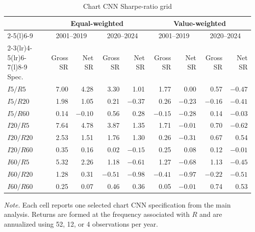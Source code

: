 \begin{table}[htbp]
\centering
\caption{Chart CNN Sharpe-ratio grid}
\label{tab:app_chart_grid}
\scriptsize
\setlength{\tabcolsep}{4.2pt}
\begin{tabular}{@{}lrrrrrrrr@{}}
\toprule
& \multicolumn{4}{c}{Equal-weighted} & \multicolumn{4}{c}{Value-weighted} \\
\cmidrule(lr){2-5}\cmidrule(l){6-9}
& \multicolumn{2}{c}{2001--2019} & \multicolumn{2}{c}{2020--2024}
& \multicolumn{2}{c}{2001--2019} & \multicolumn{2}{c}{2020--2024} \\
\cmidrule(lr){2-3}\cmidrule(lr){4-5}\cmidrule(lr){6-7}\cmidrule(l){8-9}
Spec. & Gross SR & Net SR & Gross SR & Net SR & Gross SR & Net SR & Gross SR & Net SR \\
\midrule
$I5/R5$       & 7.00 & 4.28 & 3.30 & 1.01 & 1.77 & 0.00 & 0.57 & $-0.47$ \\
$I5/R20$      & 1.98 & 1.05 & 0.21 & $-0.37$ & 0.26 & $-0.23$ & $-0.16$ & $-0.41$ \\
$I5/R60$      & 0.14 & $-0.10$ & 0.56 & 0.28 & $-0.15$ & $-0.28$ & 0.14 & $-0.03$ \\
$I20/R5$      & 7.64 & 4.78 & 3.87 & 1.35 & 1.71 & $-0.01$ & 0.70 & $-0.62$ \\
$I20/R20$     & 2.53 & 1.51 & 1.76 & 1.30 & 0.26 & $-0.31$ & 0.67 & 0.54 \\
$I20/R60$     & 0.35 & 0.16 & 0.02 & $-0.15$ & 0.25 & 0.08 & 0.12 & $-0.01$ \\
$I60/R5$      & 5.32 & 2.26 & 1.18 & $-0.61$ & 1.27 & $-0.68$ & 1.13 & $-0.45$ \\
$I60/R20$     & 1.28 & 0.31 & $-0.51$ & $-0.98$ & $-0.41$ & $-0.97$ & $-0.22$ & $-0.51$ \\
$I60/R60$     & 0.25 & 0.07 & 0.46 & 0.36 & 0.05 & $-0.01$ & 0.74 & 0.53 \\
\bottomrule
\end{tabular}
\begin{minipage}{\textwidth}
\footnotesize\textit{Note.} Each cell reports one selected chart CNN specification from the main analysis. Returns are formed at the frequency associated with $R$ and are annualized using 52, 12, or 4 observations per year.
\end{minipage}
\end{table}

